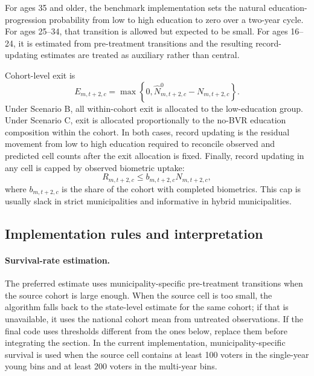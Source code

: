For ages 35 and older, the benchmark implementation sets the natural education-progression probability from low to high education to zero over a two-year cycle. For ages 25--34, that transition is allowed but expected to be small. For ages 16--24, it is estimated from pre-treatment transitions and the resulting record-updating estimates are treated as auxiliary rather than central.

Cohort-level exit is
\begin{equation}
E_{m,t+2,c}
=
\max\left\{0,\widehat N^{0}_{m,t+2,c} - N_{m,t+2,c}\right\}.
\label{eq:app_decomp_exit}
\end{equation}
Under Scenario B, all within-cohort exit is allocated to the low-education group. Under Scenario C, exit is allocated proportionally to the no-BVR education composition within the cohort. In both cases, record updating is the residual movement from low to high education required to reconcile observed and predicted cell counts after the exit allocation is fixed. Finally, record updating in any cell is capped by observed biometric uptake:
\begin{equation}
R_{m,t+2,c}
\leq
b_{m,t+2,c}N_{m,t+2,c},
\label{eq:app_decomp_bcap}
\end{equation}
where $b_{m,t+2,c}$ is the share of the cohort with completed biometrics. This cap is usually slack in strict municipalities and informative in hybrid municipalities.

\subsection{Implementation rules and interpretation}
\label{app:decomp_methods}
\label{app:decomp_implementation}

\paragraph{Survival-rate estimation.}
The preferred estimate uses municipality-specific pre-treatment transitions when the source cohort is large enough. When the source cell is too small, the algorithm falls back to the state-level estimate for the same cohort; if that is unavailable, it uses the national cohort mean from untreated observations. If the final code uses thresholds different from the ones below, replace them before integrating the section. In the current implementation, municipality-specific survival is used when the source cell contains at least 100 voters in the single-year young bins and at least 200 voters in the multi-year bins.

